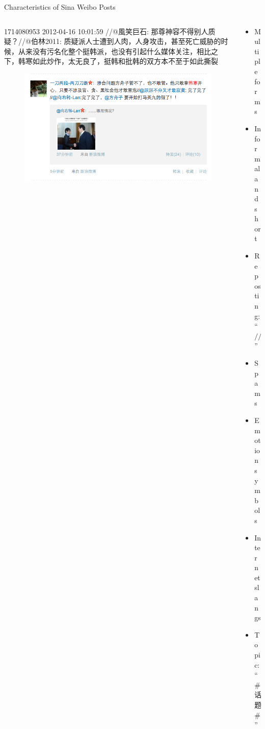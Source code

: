 \documentclass[12pt]{beamer}
\newcommand{\1}[1]{{\mathbf 1}\left\{#1\right\}}        %
\begin{document}
\begin{frame}{Characteristics of Sina Weibo Posts}

 \begin{columns}[t]
 

 \begin{column}{0.6\textwidth}
 
\begin{block}{}
 \tiny
1714080953 2012-04-16 10:01:59 //@風笑巨石: 那尊神容不得别人质疑？//@伯林2011: 
质疑派人士遭到人肉，人身攻击，甚至死亡威胁的时候，从来没有污名化整个挺韩派，也没有引起什么媒体关注，相比之下，韩寒如此炒作，太无良了，挺韩和批韩的双方本不至于如此撕裂
\end{block}

\vspace{-12pt}
\begin{figure}
	  \centering
	  \includegraphics[scale=0.35]{weiboEg.png} 
	\end{figure}
	
	
 \end{column}
 

  \begin{column}{0.4\textwidth}
	\begin{itemize}[<+->]
		\item Multiple forms
		\item Informal and short
		\item Reposting: ``$//@$''
		\item Spams
		\item Emotion symbols 
		\item Internet slangs
		\item Topic: ``\#话题\#''
	\end{itemize}
 \end{column}
 
 \end{columns}




\end{frame}
\end{document}
